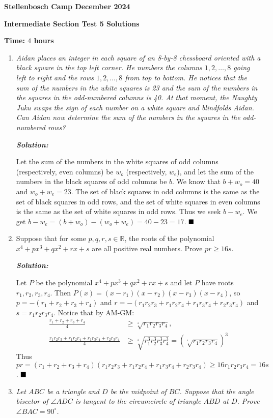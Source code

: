 \documentclass[12pt]{article}
\newcommand{\sol}{\textbf{\textit{Solution: }}}
\begin{document}
\begin{center} \large
    \textbf{Stellenbosch Camp December 2024}
    
    \textbf{Intermediate Section Test 5 Solutions}
    
    \textbf{Time: \(4\) hours}
\end{center}

\begin{enumerate}[topsep=2\bigskipamount,itemsep=\bigskipamount]
\item \textit{Aidan places an integer in each square of an 8-by-8 chessboard oriented with a black square in the top left corner. He numbers the columns $1,2,\ldots,8$ going left to right and the rows $1,2,\ldots,8$ from top to bottom. He notices that the sum of the numbers in the white squares is 23 and the sum of the numbers in the squares in the odd-numbered columns is 40. At that moment, the Naughty Juku swaps the sign of each number on a white square and blindfolds Aidan. Can Aidan now determine the sum of the numbers in the squares in the odd-numbered rows?}

\sol

Let the sum of the numbers in the white squares of odd columns (respectively, even columns) be $w_o$ (respectively, $w_e$), and let the sum of the numbers in the black squares of odd columns be $b$. We know that $b + w_o = 40$ and $w_o + w_e = 23$. The set of black squares in odd columns is the same as the set of black squares in odd rows, and the set of white squares in even columns is the same as the set of white squares in odd rows. Thus we seek $b - w_e$. We get $b - w_e = (b + w_o) - (w_o + w_e) = 40 - 23 = 17$. $\hfill\blacksquare$

\item %
Suppose that for some $p, q, r, s \in \mathbb{R}$, the roots of the polynomial $x^{4} + px^{3} + qx^{2} + rx + s$ are all positive real numbers. Prove $pr \geqslant 16s$.

\sol

Let $P$ be the polynomial $x^{4} + px^{3} + qx^{2} + rx + s$ and let $P$ have roots $r_{1}, r_{2}, r_{3}, r_{4}$. Then $P(x) = (x - r_{1})(x -r_{2})(x-r_{3})(x-r_{4})$, so $p = -(r_{1} + r_{2}+r_{3}+r_{4})$ and $r = -(r_{1}r_{2}r_{3} + r_{1}r_{2}r_{4}+r_{1}r_{3}r_{4}+r_{2}r_{3}r_{4})$ and $s = r_{1}r_{2}r_{3}r_{4}$. Notice that by AM-GM:
\begin{align*}
    \frac{r_{1} + r_{2}+r_{3}+r_{4}}{4} & \geqslant \sqrt[^4]{r_{1}r_{2}r_{3}r_{4}}, \\
    \frac{r_{1}r_{2}r_{3} + r_{1}r_{2}r_{4}+r_{1}r_{3}r_{4}+r_{2}r_{3}r_{4}}{4} & \geqslant \sqrt[^4]{r_{1}^{3}r_{2}^{3}r_{3}^{3}r_{4}^{3}} =  (\sqrt[^4]{r_{1}r_{2}r_{3}r_{4}})^{3}
\end{align*}
Thus $pr = (r_{1} + r_{2}+r_{3}+r_{4})(r_{1}r_{2}r_{3} + r_{1}r_{2}r_{4}+r_{1}r_{3}r_{4}+r_{2}r_{3}r_{4}) \geqslant 16r_{1}r_{2}r_{3}r_{4} = 16s$. $\hfill\blacksquare$
\item %
\textit{Let $ABC$ be a triangle and $D$ be the midpoint of $BC$. Suppose that the angle bisector of $\angle{ADC}$ is tangent to the circumcircle of triangle $ABD$ at $D$. Prove $\angle{BAC} = 90^{\circ}$.}


\end{enumerate}
\end{document}
